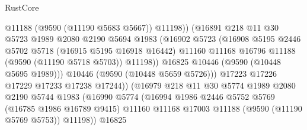 \begin{lexlean}{RustCore}
\begin{coremodule}
                                    @11188
                                    (@9590 (@11190 @5683 @5667))
                                    @11198))
                                (@16891
                                  @218
                                  @11
                                  @30
                                  @5723
                                  @1989
                                  @2080
                                  @2190
                                  @5694
                                  @1983
                                  (@16902
                                    @5723
                                    (@16908
                                      @5195
                                      @2446
                                      @5702
                                      @5718
                                      (@16915 @5195 @16918 @16442)
                                      @11160
                                      @11168
                                      @16796
                                      @11188
                                      (@9590 (@11190 @5718 @5703))
                                      @11198))
                                  @16825
                                  @10446
                                  (@9590 (@10448 @5695 @1989)))
                                @10446
                                (@9590 (@10448 @5659 @5726)))
                              @17223
                              @17226
                              @17229
                              @17233
                              @17238
                              @17244))
                          (@16979
                            @218
                            @11
                            @30
                            @5774
                            @1989
                            @2080
                            @2190
                            @5744
                            @1983
                            (@16990
                              @5774
                              (@16994
                                @1986
                                @2446
                                @5752
                                @5769
                                (@16785 @1986 @16789 @9415)
                                @11160
                                @11168
                                @17003
                                @11188
                                (@9590 (@11190 @5769 @5753))
                                @11198))
                            @16825

\end{coremodule}
\end{lexlean}
